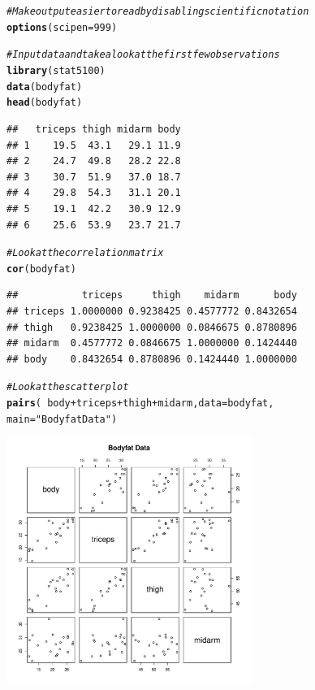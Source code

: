 \documentclass{article}\usepackage[]{graphicx}\usepackage[]{color}
\makeatletter
\newcommand{\hlnum}[1]{\textcolor[rgb]{0.686,0.059,0.569}{#1}}%
\newcommand{\hlstr}[1]{\textcolor[rgb]{0.192,0.494,0.8}{#1}}%
\newcommand{\hlcom}[1]{\textcolor[rgb]{0.678,0.584,0.686}{\textit{#1}}}%
\newcommand{\hlopt}[1]{\textcolor[rgb]{0,0,0}{#1}}%
\newcommand{\hlstd}[1]{\textcolor[rgb]{0.345,0.345,0.345}{#1}}%
\newcommand{\hlkwc}[1]{\textcolor[rgb]{0.333,0.667,0.333}{#1}}%
\newcommand{\hlkwd}[1]{\textcolor[rgb]{0.737,0.353,0.396}{\textbf{#1}}}%
\newenvironment{kframe}{%
 \def\at@end@of@kframe{}%
 \ifinner\ifhmode%
  \def\at@end@of@kframe{\end{minipage}}%
  \begin{minipage}{\columnwidth}%
 \fi\fi%
 \def\FrameCommand##1{\hskip\@totalleftmargin \hskip-\fboxsep
 \colorbox{shadecolor}{##1}\hskip-\fboxsep
     \hskip-\linewidth \hskip-\@totalleftmargin \hskip\columnwidth}%
 \MakeFramed {\advance\hsize-\width
   \@totalleftmargin\z@ \linewidth\hsize
   \@setminipage}}%
 {\par\unskip\endMakeFramed%
 \at@end@of@kframe}
\newenvironment{knitrout}{}{} %
\makeatother
\begin{document}
\begin{knitrout}
\color{fgcolor}\begin{kframe}
\begin{alltt}
\hlcom{# Make output easier to read by disabling scientific notation}
\hlkwd{options}\hlstd{(}\hlkwc{scipen} \hlstd{=} \hlnum{999}\hlstd{)}

\hlcom{# Input data and take a look at the first few observations}
\hlkwd{library}\hlstd{(stat5100)}
\hlkwd{data}\hlstd{(bodyfat)}
\hlkwd{head}\hlstd{(bodyfat)}
\end{alltt}
\begin{verbatim}
##   triceps thigh midarm body
## 1    19.5  43.1   29.1 11.9
## 2    24.7  49.8   28.2 22.8
## 3    30.7  51.9   37.0 18.7
## 4    29.8  54.3   31.1 20.1
## 5    19.1  42.2   30.9 12.9
## 6    25.6  53.9   23.7 21.7
\end{verbatim}
\begin{alltt}
\hlcom{# Look at the correlation matrix}
\hlkwd{cor}\hlstd{(bodyfat)}
\end{alltt}
\begin{verbatim}
##           triceps     thigh    midarm      body
## triceps 1.0000000 0.9238425 0.4577772 0.8432654
## thigh   0.9238425 1.0000000 0.0846675 0.8780896
## midarm  0.4577772 0.0846675 1.0000000 0.1424440
## body    0.8432654 0.8780896 0.1424440 1.0000000
\end{verbatim}
\begin{alltt}
\hlcom{# Look at the scatterplot}
\hlkwd{pairs}\hlstd{(} \hlopt{~} \hlstd{body} \hlopt{+} \hlstd{triceps} \hlopt{+} \hlstd{thigh} \hlopt{+} \hlstd{midarm,} \hlkwc{data} \hlstd{= bodyfat,}
       \hlkwc{main} \hlstd{=} \hlstr{"Bodyfat Data"}\hlstd{)}
\end{alltt}
\end{kframe}

{\centering \includegraphics[width=0.6\textwidth]{figure/unnamed-chunk-1-1} 

}



\end{knitrout}
\end{document}
